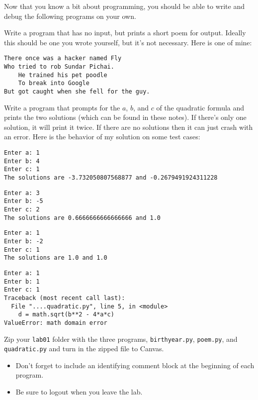 \documentclass[12pt]{article}
\begin{document}
Now that you know a bit about programming, you should be
able to write and debug the following programs on your own.

\begin{description}
\item[poem.py]
Write a program that has no input, but prints a short poem
for output.
Ideally this should be one you wrote yourself, but
it's not necessary.
Here is one of mine:
\begin{Verbatim}[frame=single]
There once was a hacker named Fly
Who tried to rob Sundar Pichai.
    He trained his pet poodle
    To break into Google
But got caught when she fell for the guy.
\end{Verbatim}

\item[quadratic.py]  

Write a program that prompts for the $a$, $b$, and $c$
of the quadratic formula and
prints the two solutions 
(which can be found in these notes).
If there's only one solution, it will print it twice.
If there are no solutions then it can just 
crash with an error.  Here is the behavior of my
solution on some test cases:
\begin{Verbatim}[frame=single]
Enter a: 1
Enter b: 4
Enter c: 1
The solutions are -3.732050807568877 and -0.2679491924311228
\end{Verbatim}
\begin{Verbatim}[frame=single]
Enter a: 3
Enter b: -5
Enter c: 2
The solutions are 0.6666666666666666 and 1.0
\end{Verbatim}
\begin{Verbatim}[frame=single]
Enter a: 1
Enter b: -2
Enter c: 1
The solutions are 1.0 and 1.0
\end{Verbatim}

\begin{Verbatim}[frame=single]
Enter a: 1
Enter b: 1
Enter c: 1
Traceback (most recent call last):
  File "....quadratic.py", line 5, in <module>
    d = math.sqrt(b**2 - 4*a*c)
ValueError: math domain error
\end{Verbatim}

\item

\item[Upon completion:] Zip your \verb|lab01| folder
with the three programs, \verb|birthyear.py|,
\verb|poem.py|, and \verb|quadratic.py|
and turn in the zipped file to Canvas.

\begin{itemize}
\item
Don't forget to include an identifying comment block
at the beginning of each program.
\item
Be sure to logout when you leave the lab.
\end{itemize}

\end{description}
\end{document}
